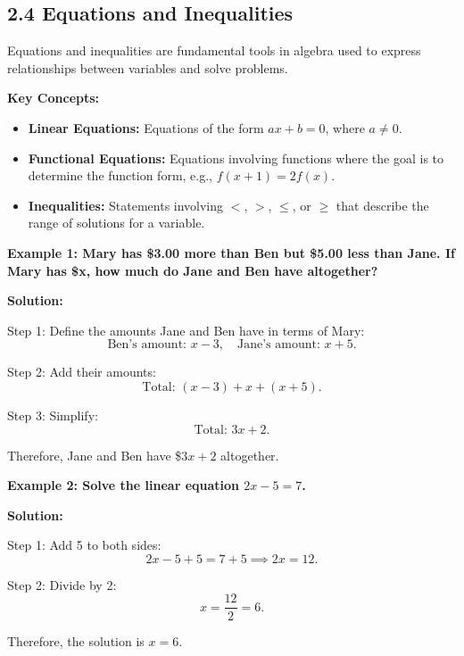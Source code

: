 
\subsection*{2.4 Equations and Inequalities}
Equations and inequalities are fundamental tools in algebra used to express relationships between variables and solve problems. 

\textbf{Key Concepts:}
\begin{itemize}
    \item \textbf{Linear Equations:} Equations of the form $ax + b = 0$, where $a \neq 0$.
    
    \item \textbf{Functional Equations:} Equations involving functions where the goal is to determine the function form, e.g., $f(x+1) = 2f(x)$.
    \item \textbf{Inequalities:} Statements involving $<$, $>$, $\leq$, or $\geq$ that describe the range of solutions for a variable.
\end{itemize}


\begin{flushleft}
\textbf{Example 1: Mary has \$3.00 more than Ben but \$5.00 less than Jane. If Mary has \$x, how much do Jane and Ben have altogether?}

\vspace{0.5cm}
\textbf{Solution:}
\vspace{0.5cm}

Step 1: Define the amounts Jane and Ben have in terms of Mary:
\[
\text{Ben's amount: } x - 3, \quad \text{Jane's amount: } x + 5.
\]

Step 2: Add their amounts:
\[
\text{Total: } (x - 3) + x + (x + 5).
\]

Step 3: Simplify:
\[
\text{Total: } 3x + 2.
\]

Therefore, Jane and Ben have \$\(3x + 2\) altogether.
\end{flushleft}



\begin{flushleft}
\textbf{Example 2: Solve the linear equation $2x - 5 = 7$.}

\vspace{0.5cm}
\textbf{Solution:}
\vspace{0.5cm}

Step 1: Add 5 to both sides:
\[
2x - 5 + 5 = 7 + 5 \implies 2x = 12.
\]

Step 2: Divide by 2:
\[
x = \frac{12}{2} = 6.
\]

Therefore, the solution is $x = 6$.
\end{flushleft}



